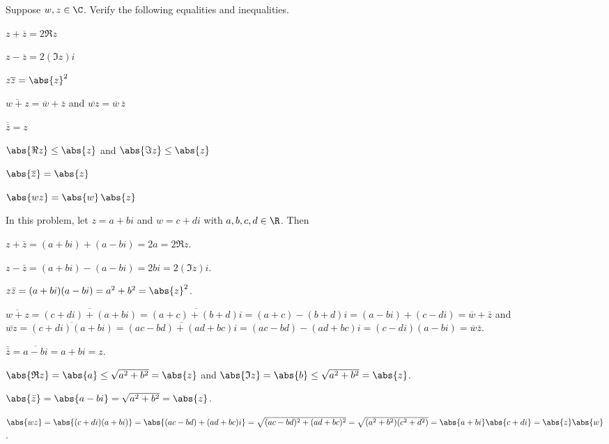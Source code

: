 \begin{exc}

\begin{exercise}
Suppose $w,z\in\C$. Verify the following equalities and inequalities.
\begin{parts}
\item $z+\overline{z}=2\Re z$
\item $z-\overline{z}=2(\Im z)i$
\item $z\overline{z}=\abs{z}^2$
\item $\overline{w+z}=\overline{w}+\overline{z}$ and
  $\overline{wz}=\overline{w}\,\overline{z}$
\item $\overline{\overline{z}}=z$
\item $\abs{\Re z}\le\abs{z}$ and $\abs{\Im z}\le\abs{z}$
\item $\abs{\overline{z}}=\abs{z}$
\item $\abs{wz}=\abs{w}\,\abs{z}$
\end{parts}
\end{exercise}
\begin{solution}
In this problem, let $z=a+bi$ and $w=c+di$ with $a,b,c,d\in\R$. Then
\begin{parts}
\item $z+\bar{z}=(a+bi)+(a-bi)=2a=2\mathfrak{R}z$.
\item $z-\bar{z}=(a+bi)-(a-bi)=2bi=2(\mathfrak{I}z)i$.
\item $z\bar{z}=(a+bi)(a-bi)=a^2+b^2=\abs{z}^2$.
\item $\overline{w+z}=\overline{(c+di)+(a+bi)}=\overline{(a+c)+(b+d)i}
  =(a+c)-(b+d)i=(a-bi)+(c-di)=\overline{w}+\bar{z}$ and
  $\overline{wz}=\overline{(c+di)(a+bi)}=\overline{(ac-bd)+(ad+bc)i}
  =(ac-bd)-(ad+bc)i=(c-di)(a-bi)=\overline{w}\bar{z}$.
\item $\bar{\bar{z}}=\overline{a-bi}=a+bi=z$.
\item $\abs{\mathfrak{R}z}=\abs{a}\le\sqrt{a^2+b^2}=\abs{z}$ and
  $\abs{\mathfrak{I}z}=\abs{b}\le\sqrt{a^2+b^2}=\abs{z}$.
\item $\abs{\bar{z}}=\abs{a-bi}=\sqrt{a^2+b^2}=\abs{z}$.
\item $\abs{wz}=\abs{(c+di)(a+bi)}=\abs{(ac-bd)+(ad+bc)i}
  =\sqrt{(ac-bd)^2+(ad+bc)^2}=\sqrt{(a^2+b^2)(c^2+d^2)}
  =\abs{a+bi}\abs{c+di}=\abs{z}\abs{w}$. \qedhere
\end{parts}
\end{solution}


\end{exc}
